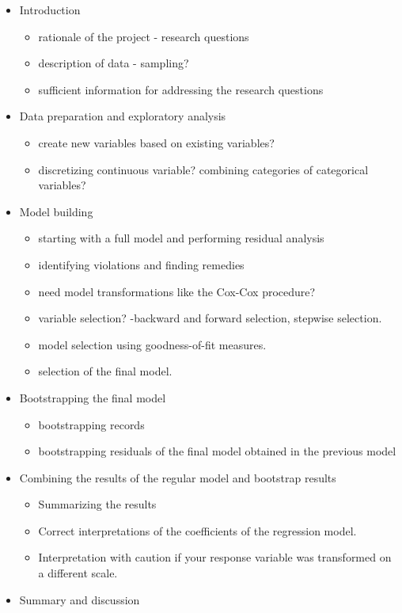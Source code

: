 \documentclass[
]{book}
\providecommand{\tightlist}{%
  \setlength{\itemsep}{0pt}\setlength{\parskip}{0pt}}
\begin{document}
\begin{itemize}
\tightlist
\item
  Introduction

  \begin{itemize}
  \tightlist
  \item
    rationale of the project - research questions
  \item
    description of data - sampling?
  \item
    sufficient information for addressing the research questions
  \end{itemize}
\item
  Data preparation and exploratory analysis

  \begin{itemize}
  \tightlist
  \item
    create new variables based on existing variables?
  \item
    discretizing continuous variable? combining categories of categorical variables?
  \end{itemize}
\item
  Model building

  \begin{itemize}
  \tightlist
  \item
    starting with a full model and performing residual analysis
  \item
    identifying violations and finding remedies
  \item
    need model transformations like the Cox-Cox procedure?
  \item
    variable selection? -backward and forward selection, stepwise selection.
  \item
    model selection using goodness-of-fit measures.
  \item
    selection of the final model.
  \end{itemize}
\item
  Bootstrapping the final model

  \begin{itemize}
  \tightlist
  \item
    bootstrapping records
  \item
    bootstrapping residuals of the final model obtained in the previous model
  \end{itemize}
\item
  Combining the results of the regular model and bootstrap results

  \begin{itemize}
  \tightlist
  \item
    Summarizing the results
  \item
    Correct interpretations of the coefficients of the regression model.
  \item
    Interpretation with caution if your response variable was transformed on a different scale.
  \end{itemize}
\item
  Summary and discussion


\end{itemize}
\end{document}
